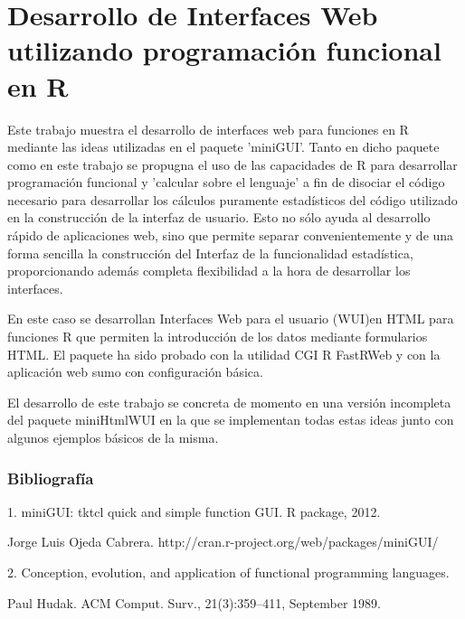 \chapter{Desarrollo de Interfaces Web utilizando programación funcional en R}




Este trabajo muestra el desarrollo de interfaces web para funciones en R mediante las ideas utilizadas en el paquete 'miniGUI'. Tanto en dicho paquete como en este trabajo se propugna el uso de las capacidades de R para desarrollar programación funcional y 'calcular sobre el lenguaje' a fin de disociar el código necesario para desarrollar los  cálculos puramente estadísticos del código utilizado en la construcción de la interfaz 
de usuario. Esto no sólo ayuda al desarrollo rápido de aplicaciones web, sino que permite separar convenientemente y de una forma sencilla la construcción del Interfaz de la funcionalidad estadística, proporcionando además completa flexibilidad a la hora de desarrollar los interfaces.

  En este caso se desarrollan Interfaces Web para el usuario (WUI)en HTML para 
funciones R que permiten la introducción de los datos mediante formularios HTML. 
El paquete ha sido probado con la utilidad CGI R FastRWeb y con la aplicación 
web sumo con configuración básica.

  El desarrollo de este trabajo se concreta de momento en una versión incompleta
del paquete miniHtmlWUI en la que se implementan todas estas ideas junto 
con algunos ejemplos básicos de la misma. \bigskip\subsection*{Bibliografía}

 1. miniGUI: tktcl quick and simple function GUI. R package, 2012.

Jorge Luis Ojeda Cabrera.  http://cran.r-project.org/web/packages/miniGUI/ 



2. Conception, evolution, and application of functional programming languages.

 Paul Hudak.  ACM Comput. Surv., 21(3):359--411, September 1989.

%

%
